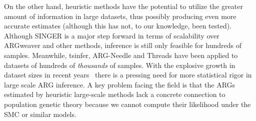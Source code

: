 \documentclass{article}
\begin{document}
On the other hand, heuristic methods have the potential
to utilize the greater amount of information in large datasets,
thus possibly producing even more accurate estimates
(although this has not, to our knowledge, been tested).
Although SINGER is a major step forward
in terms of scalability over ARGweaver and other methods, inference is still 
only feasible for hundreds of samples. 
Meanwhile, tsinfer, ARG-Needle and Threads have 
been applied to datasets of hundreds of \emph{thousands} of samples.
With the explosive growth in dataset
sizes in recent years~\citep{caulfield2017national,turnbull2018100,
bycroft2018genome,backman2021exome,halldorsson2022sequences,uk2023whole,
all2024genomic,stark2024call,cook2025our}
there is a pressing need for more statistical
rigor in large scale ARG inference.
A key problem facing the field is that the ARGs estimated by heuristic large-scale 
methods lack a concrete connection to population genetic theory because
we cannot compute their likelihood under the SMC or similar models. 
\end{document}
